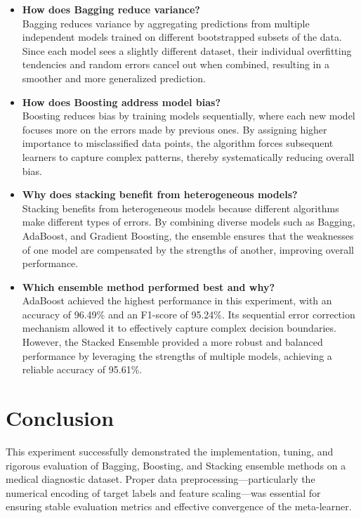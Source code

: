 \documentclass[11pt]{article}
\begin{document}
\begin{itemize}
    \item \textbf{How does Bagging reduce variance?} \\
    Bagging reduces variance by aggregating predictions from multiple independent models trained on different bootstrapped subsets of the data. Since each model sees a slightly different dataset, their individual overfitting tendencies and random errors cancel out when combined, resulting in a smoother and more generalized prediction.

    \item \textbf{How does Boosting address model bias?} \\
    Boosting reduces bias by training models sequentially, where each new model focuses more on the errors made by previous ones. By assigning higher importance to misclassified data points, the algorithm forces subsequent learners to capture complex patterns, thereby systematically reducing overall bias.

    \item \textbf{Why does stacking benefit from heterogeneous models?} \\
    Stacking benefits from heterogeneous models because different algorithms make different types of errors. By combining diverse models such as Bagging, AdaBoost, and Gradient Boosting, the ensemble ensures that the weaknesses of one model are compensated by the strengths of another, improving overall performance.

    \item \textbf{Which ensemble method performed best and why?} \\
    AdaBoost achieved the highest performance in this experiment, with an accuracy of 96.49\% and an F1-score of 95.24\%. Its sequential error correction mechanism allowed it to effectively capture complex decision boundaries. However, the Stacked Ensemble provided a more robust and balanced performance by leveraging the strengths of multiple models, achieving a reliable accuracy of 95.61\%.
\end{itemize}

\section{Conclusion}

This experiment successfully demonstrated the implementation, tuning, and rigorous evaluation of Bagging, Boosting, and Stacking ensemble methods on a medical diagnostic dataset. Proper data preprocessing—particularly the numerical encoding of target labels and feature scaling—was essential for ensuring stable evaluation metrics and effective convergence of the meta-learner.
\end{document}
